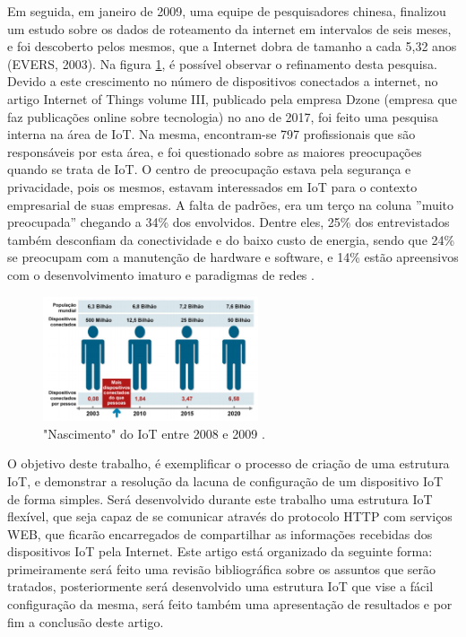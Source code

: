 \documentclass[journal]{IEEEtran}
\begin{document}
Em seguida, em janeiro de 2009, uma equipe de pesquisadores chinesa, finalizou um estudo sobre os dados de roteamento da internet em intervalos de seis meses, e foi descoberto pelos mesmos, que a Internet dobra de tamanho a cada 5,32 anos (EVERS, 2003). Na figura \ref{fig_um}, é possível observar o refinamento desta pesquisa. Devido a este crescimento no número de dispositivos conectados a internet, no artigo Internet of Things volume III, publicado pela empresa Dzone (empresa que faz publicações online sobre tecnologia) no ano de 2017, foi feito uma pesquisa interna na área de IoT. Na mesma, encontram-se 797 profissionais que são responsáveis por esta área, e foi questionado sobre as maiores preocupações quando se trata de IoT. O centro de preocupação estava pela segurança e privacidade, pois os mesmos, estavam interessados em IoT para o contexto empresarial de suas empresas. A falta de padrões, era um terço na coluna ''muito preocupada'' chegando a 34\% dos envolvidos. Dentre eles, 25\% dos entrevistados também  desconfiam da conectividade e do baixo custo de energia, sendo que 24\% se preocupam com a manutenção de hardware e software, e 14\% estão apreensivos com o desenvolvimento imaturo e paradigmas de redes \cite[p.~4]{Evans}.

\begin{figure}[H]
\centering
\includegraphics[width=2.5in]{um}
\caption{"Nascimento" do IoT entre 2008 e 2009 \cite{Evans}.}
\label{fig_um}
\end{figure}

O objetivo deste trabalho, é exemplificar o processo de criação de uma estrutura IoT, e demonstrar a resolução da lacuna de configuração de um dispositivo IoT de forma simples. Será desenvolvido durante este trabalho uma estrutura IoT flexível, que seja capaz de se comunicar através do protocolo HTTP com serviços WEB, que ficarão encarregados de compartilhar as informações recebidas dos dispositivos IoT pela Internet. Este artigo está organizado da seguinte forma: primeiramente será feito uma revisão bibliográfica sobre os assuntos que serão tratados, posteriormente será desenvolvido uma estrutura IoT que vise a fácil configuração da mesma, será feito também uma apresentação de resultados e por fim a conclusão deste artigo.
\end{document}
